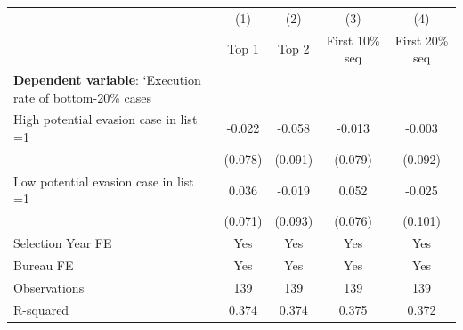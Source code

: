 {
\def\sym#1{\ifmmode^{#1}\else\(^{#1}\)\fi}
\begin{tabular}{l*{4}{c}}
\toprule
            &\multicolumn{1}{c}{(1)}&\multicolumn{1}{c}{(2)}&\multicolumn{1}{c}{(3)}&\multicolumn{1}{c}{(4)}\\
            &\multicolumn{1}{c}{Top 1}&\multicolumn{1}{c}{Top 2}&\multicolumn{1}{c}{First 10\% seq}&\multicolumn{1}{c}{First 20\% seq}\\
\midrule
\textbf{Dependent variable}: `Execution rate of bottom-20\% cases&                     &                     &                     &                     \\
\addlinespace
High potential evasion case in list =1&      -0.022         &      -0.058         &      -0.013         &      -0.003         \\
            &     (0.078)         &     (0.091)         &     (0.079)         &     (0.092)         \\
\addlinespace
Low potential evasion case in list =1&       0.036         &      -0.019         &       0.052         &      -0.025         \\
            &     (0.071)         &     (0.093)         &     (0.076)         &     (0.101)         \\
\midrule
Selection Year FE&         Yes         &         Yes         &         Yes         &         Yes         \\
Bureau FE   &         Yes         &         Yes         &         Yes         &         Yes         \\
Observations&         139         &         139         &         139         &         139         \\
R-squared   &       0.374         &       0.374         &       0.375         &       0.372         \\
\bottomrule
\end{tabular}
}
